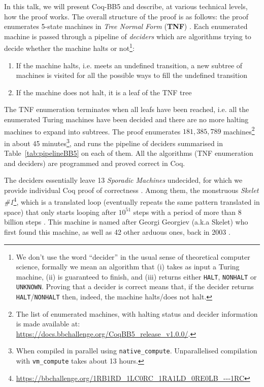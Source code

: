 \documentclass{easychair}
\newcommand{\CoqBB}{Coq-BB5\xspace}
\theoremstyle{definition} %
\numberwithin{equation}{section}
\theoremstyle{definition} %
\begin{document}
In this talk, we will present \CoqBB and describe, at various technical levels, how the proof works. The overall structure of the proof is as follows: the proof enumerates 5-state machines in \textit{Tree Normal Form} (\textbf{TNF}) \cite{Brady64,Brady83,Marxen_1990}. Each enumerated machine is passed through a pipeline of \textit{deciders} which are algorithms trying to decide whether the machine halts or not\footnote{We don't use the word ``decider'' in the usual sense of theoretical computer science, formally we mean an algorithm that (i) takes as input a Turing machine, (ii) is guaranteed to finish, and (iii) returns either \texttt{HALT}, \texttt{NONHALT} or \texttt{UNKNOWN}. Proving that a decider is correct means that, if the decider returns \texttt{HALT}/\texttt{NONHALT} then, indeed, the machine halts/does not halt.}:
\begin{enumerate}
  \item If the machine halts, i.e. meets an undefined transition, a new subtree of machines is visited for all the possible ways to fill the undefined transition
  \item If the machine does not halt, it is a leaf of the TNF tree
\end{enumerate}
The TNF enumeration terminates when all leafs have been reached, i.e. all the enumerated Turing machines have been decided and there are no more halting machines to expand into subtrees. The proof enumerates $181{,}385{,}789$ machines\footnote{The list of enumerated machines, with halting status and decider information is made available at: \url{https://docs.bbchallenge.org/CoqBB5_release_v1.0.0/}.} in about 45 minutes\footnote{When compiled in parallel using \texttt{native\_compute}. Unparallelised compilation with \texttt{vm\_compute} takes about 13 hours.}, and runs the pipeline of deciders summarised in Table~\ref{tab:pipelineBB5} on each of them. All the algorithms (TNF enumeration and deciders) are programmed and proved correct in Coq.

The deciders essentially leave 13 \textit{Sporadic Machines} undecided, for which we provide individual Coq proof of correctness \cite{busycoq,xu2024skelet17fifthbusy}. Among them, the monstruous \textit{Skelet \#1}\footnote{\url{https://bbchallenge.org/1RB1RD_1LC0RC_1RA1LD_0RE0LB_---1RC}}, which is a translated loop (\ie eventually repeats the same pattern translated in space) that only starts looping after $10^{51}$ steps with a period of more than $8$ billion steps \cite{ShawnSkelet1}. This machine is named after Georgi Georgiev (a.k.a Skelet) who first found this machine, as well as 42 other arduous ones, back in 2003 \cite{Skelet_bbfind}.
\end{document}
